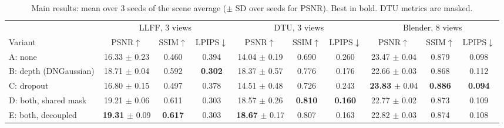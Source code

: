\documentclass[conference]{IEEEtran}
\begin{document}
\begin{table}[t]
\caption{Main results: mean over 3 seeds of the scene average ($\pm$ SD over seeds for PSNR). Best in bold. DTU metrics are masked.}\label{tab:main}
\centering\footnotesize\setlength{\tabcolsep}{4pt}
\begin{tabular}{@{}lccccccccc@{}}
\toprule
 & \multicolumn{3}{c}{LLFF, 3 views} & \multicolumn{3}{c}{DTU, 3 views} & \multicolumn{3}{c}{Blender, 8 views} \\
\cmidrule(lr){2-4}\cmidrule(lr){5-7}\cmidrule(l){8-10}
Variant & PSNR$\uparrow$ & SSIM$\uparrow$ & LPIPS$\downarrow$ & PSNR$\uparrow$ & SSIM$\uparrow$ & LPIPS$\downarrow$ & PSNR$\uparrow$ & SSIM$\uparrow$ & LPIPS$\downarrow$ \\
\midrule
A: none & 16.33 $\pm$ 0.23 & 0.460 & 0.394 & 14.04 $\pm$ 0.19 & 0.690 & 0.260 & 23.47 $\pm$ 0.04 & 0.879 & 0.098 \\
B: depth (DNGaussian) & 18.71 $\pm$ 0.04 & 0.592 & \textbf{0.302} & 18.37 $\pm$ 0.57 & 0.776 & 0.176 & 22.66 $\pm$ 0.03 & 0.868 & 0.112 \\
C: dropout & 16.80 $\pm$ 0.15 & 0.497 & 0.378 & 14.51 $\pm$ 0.48 & 0.726 & 0.243 & \textbf{23.83} $\pm$ 0.04 & \textbf{0.886} & \textbf{0.094} \\
D: both, shared mask & 19.21 $\pm$ 0.06 & 0.611 & 0.303 & 18.57 $\pm$ 0.26 & \textbf{0.810} & \textbf{0.160} & 22.77 $\pm$ 0.02 & 0.873 & 0.109 \\
E: both, decoupled & \textbf{19.31} $\pm$ 0.09 & \textbf{0.617} & 0.303 & \textbf{18.67} $\pm$ 0.17 & 0.807 & 0.163 & 22.82 $\pm$ 0.03 & 0.874 & 0.108 \\
\bottomrule
\end{tabular}
\end{table}
\end{document}
